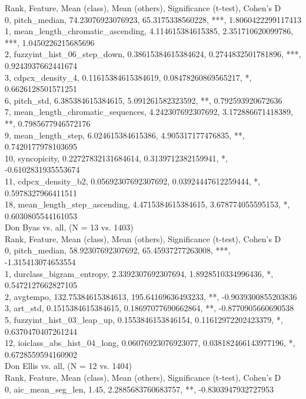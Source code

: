 Rank, Feature, Mean (class), Mean (others), Significance (t-test), Cohen's D\\
0, pitch_median, 74.23076923076923, 65.3175338560228, ***, 1.8060422299117413\\
1, mean_length_chromatic_ascending, 4.114615384615385, 2.351710620099786, ***, 1.0450226215685696\\
2, fuzzyint_hist_06_step_down, 0.38615384615384624, 0.2744832501781896, ***, 0.9243937662441674\\
3, cdpcx_density_4, 0.11615384615384619, 0.08478260869565217, *, 0.6626128501571251\\
6, pitch_std, 6.385384615384615, 5.091261582323592, **, 0.792593920672636\\
7, mean_length_chromatic_sequences, 4.242307692307692, 3.172886671418389, **, 0.7985677946572176\\
9, mean_length_step, 6.024615384615386, 4.905317177476835, **, 0.7420177978103695\\
10, syncopicity, 0.22727832131684614, 0.3139712382159941, *, -0.6102831935553674\\
11, cdpcx_density_b2, 0.05692307692307692, 0.03924447612259444, *, 0.5978327966411511\\
18, mean_length_step_ascending, 4.4715384615384615, 3.678774055595153, *, 0.6030805544161053\\
Don Byas vs. all, (N = 13 vs. 1403)\\
Rank, Feature, Mean (class), Mean (others), Significance (t-test), Cohen's D\\
0, pitch_median, 58.92307692307692, 65.45937277263008, ***, -1.315413074653554\\
1, durclass_bigram_entropy, 2.3392307692307694, 1.8928510334996436, *, 0.5472127662827105\\
2, avgtempo, 132.75384615384613, 195.64169636493233, **, -0.9039300855203836\\
3, art_std, 0.1515384615384615, 0.18697077690662864, **, -0.8770905660690538\\
5, fuzzyint_hist_03_leap_up, 0.1553846153846154, 0.11612972202423379, *, 0.6370470407261244\\
12, ioiclass_abs_hist_04_long, 0.06076923076923077, 0.038182466143977196, *, 0.6728559594160902\\
Don Ellis vs. all, (N = 12 vs. 1404)\\
Rank, Feature, Mean (class), Mean (others), Significance (t-test), Cohen's D\\
0, aic_mean_seg_len, 1.45, 2.2885683760683757, **, -0.8303947932727953\\
